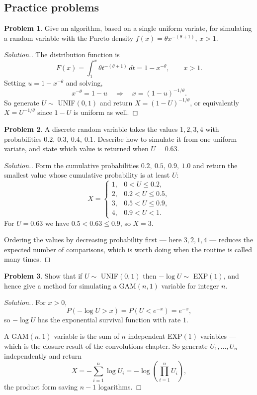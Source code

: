 \documentclass[11pt,a4paper]{article}
\theoremstyle{definition}
\newtheorem{problemx}{Problem}[subsection]
\newenvironment{problem}{\begin{problemx}}{\end{problemx}}
\newenvironment{solution}
  {\renewcommand{\qedsymbol}{}\begin{proof}[\textit{Solution}.]}
  {\end{proof}}
\begin{document}
\subsection{Practice problems}

\begin{problem}
Give an algorithm, based on a single uniform variate, for simulating a random
variable with the Pareto density $f(x) = \theta x^{-(\theta+1)}$, $x>1$.
\end{problem}
\begin{solution}
The distribution function is
$$F(x) = \int_1^{x}\theta t^{-(\theta+1)}\,dt = 1 - x^{-\theta},\qquad x>1 .$$
Setting $u = 1-x^{-\theta}$ and solving,
$$x^{-\theta} = 1-u \quad\Longrightarrow\quad x = (1-u)^{-1/\theta}.$$
So generate $U\sim$ UNIF$(0,1)$ and return $X = (1-U)^{-1/\theta}$, or
equivalently $X = U^{-1/\theta}$ since $1-U$ is uniform as well.
\end{solution}

\begin{problem}
A discrete random variable takes the values $1,2,3,4$ with probabilities
$0.2,\ 0.3,\ 0.4,\ 0.1$. Describe how to simulate it from one uniform variate,
and state which value is returned when $U = 0.63$.
\end{problem}
\begin{solution}
Form the cumulative probabilities $0.2,\ 0.5,\ 0.9,\ 1.0$ and return the
smallest value whose cumulative probability is at least $U$:
$$X = \begin{cases}
1, & 0<U\leq0.2,\\
2, & 0.2<U\leq0.5,\\
3, & 0.5<U\leq0.9,\\
4, & 0.9<U<1 .
\end{cases}$$
For $U=0.63$ we have $0.5<0.63\leq0.9$, so $X=3$.

Ordering the values by decreasing probability first --- here $3,2,1,4$ ---
reduces the expected number of comparisons, which is worth doing when the
routine is called many times.
\end{solution}

\begin{problem}
Show that if $U\sim$ UNIF$(0,1)$ then $-\log U \sim$ EXP$(1)$, and hence give a
method for simulating a GAM$(n,1)$ variable for integer $n$.
\end{problem}
\begin{solution}
For $x>0$,
$$P\left(-\log U > x\right) = P\left(U < e^{-x}\right) = e^{-x},$$
so $-\log U$ has the exponential survival function with rate $1$.

A GAM$(n,1)$ variable is the sum of $n$ independent EXP$(1)$ variables --- which
is the closure result of the convolutions chapter. So generate
$U_1,\dots,U_n$ independently and return
$$X = -\sum_{i=1}^{n}\log U_i = -\log\left(\prod_{i=1}^{n}U_i\right),$$
the product form saving $n-1$ logarithms.
\end{solution}
\end{document}
